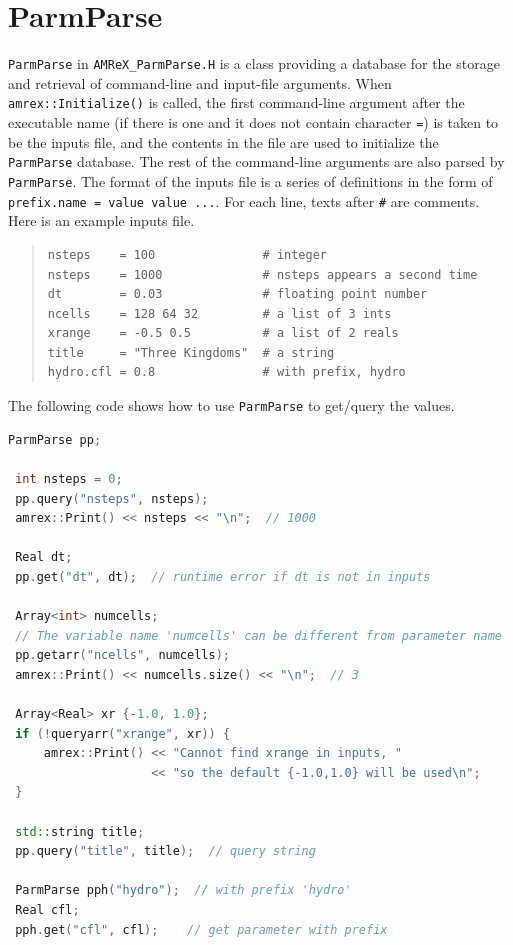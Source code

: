 \section{ParmParse}

{\tt ParmParse} in {\tt AMReX\_ParmParse.H} is a class providing a
database for the storage and retrieval of command-line and input-file
arguments.  When {\tt amrex::Initialize()} is called, the first
command-line argument after the executable name (if there is one and
it does not contain character {\tt =}) is taken to be the inputs file,
and the contents in the file are used to initialize the {\tt
  ParmParse} database.  The rest of the command-line arguments are
also parsed by {\tt ParmParse}.  The format of the inputs file is a
series of definitions in the form of {\tt prefix.name = value value
  ...}.  For each line, texts after {\tt \#} are comments.  Here is an
example inputs file.
\begin{quote}
\begin{verbatim}
nsteps    = 100               # integer
nsteps    = 1000              # nsteps appears a second time
dt        = 0.03              # floating point number
ncells    = 128 64 32         # a list of 3 ints
xrange    = -0.5 0.5          # a list of 2 reals
title     = "Three Kingdoms"  # a string
hydro.cfl = 0.8               # with prefix, hydro 
\end{verbatim}
\end{quote}
The following code shows how to use {\tt ParmParse} to get/query the values.
\begin{lstlisting}[language=cpp]
 ParmParse pp;
 
 int nsteps = 0;
 pp.query("nsteps", nsteps);
 amrex::Print() << nsteps << "\n";  // 1000
 
 Real dt;
 pp.get("dt", dt);  // runtime error if dt is not in inputs
 
 Array<int> numcells;
 // The variable name 'numcells' can be different from parameter name 'ncells'.
 pp.getarr("ncells", numcells);
 amrex::Print() << numcells.size() << "\n";  // 3
 
 Array<Real> xr {-1.0, 1.0};
 if (!queryarr("xrange", xr)) {
     amrex::Print() << "Cannot find xrange in inputs, "
                    << "so the default {-1.0,1.0} will be used\n";
 }
 
 std::string title;
 pp.query("title", title);  // query string
 
 ParmParse pph("hydro");  // with prefix 'hydro'
 Real cfl;
 pph.get("cfl", cfl);    // get parameter with prefix
\end{lstlisting}
